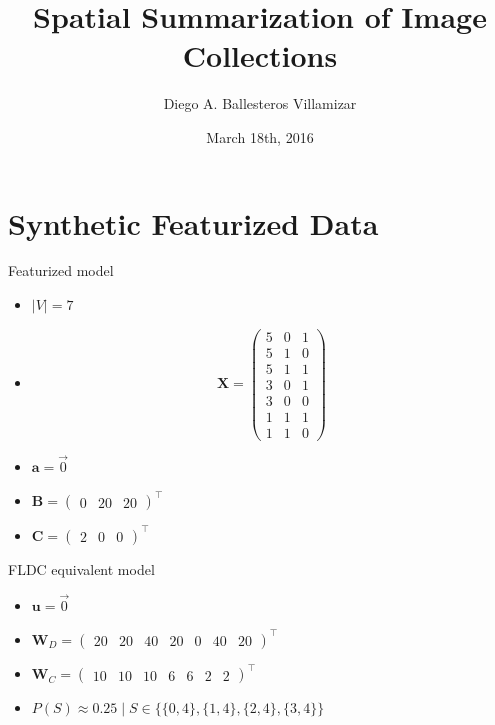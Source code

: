 \documentclass{beamer}
\title[M.Sc. Thesis 2015]{Spatial Summarization of Image Collections}
\author{Diego A. Ballesteros Villamizar}
\institute[ETHZ]{ETH Zürich}
\date{March 18th, 2016}
\begin{document}
\begin{frame}
  \titlepage
\end{frame}

\section{Synthetic Featurized Data}

\begin{frame}{Featurized model}
  \begin{itemize}
    \item $|V| = 7$
    \item \begin{equation*}
      \mathbf{X} = \left( \begin{array}{ccc}
      5 & 0 & 1 \\
      5 & 1 & 0 \\
      5 & 1 & 1 \\
      3 & 0 & 1 \\
      3 & 0 & 0 \\
      1 & 1 & 1 \\
      1 & 1 & 0 \end{array} \right)
    \end{equation*}
    \item $\mathbf{a} = \overrightarrow{0}$
    \item $\mathbf{B} = \left( \begin{array}{ccc} 0 & 20 & 20\end{array}\right)^{\intercal}$
    \item $\mathbf{C} = \left( \begin{array}{ccc} 2 & 0 & 0 \end{array}\right)^{\intercal}$
  \end{itemize}
\end{frame}

\begin{frame}{FLDC equivalent model}
  \begin{itemize}
    \item $\mathbf{u} = \overrightarrow{0}$
    \item $\mathbf{W}_{D} = \left( \begin{array}{ccccccc} 20 & 20 & 40 & 20 & 0 & 40 & 20 \end{array}\right)^{\intercal}$
    \item $\mathbf{W}_{C} = \left( \begin{array}{ccccccc} 10 & 10 & 10 & 6 & 6 & 2 & 2 \end{array}\right)^{\intercal}$
    \item $P(S) \approx 0.25 \mid S \in \{\{0, 4\}, \{1, 4\}, \{2, 4\}, \{3, 4\}\}$
  \end{itemize}
\end{frame}
\end{document}
